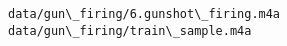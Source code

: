 \documentclass[11pt]{article}
\begin{document}
    \begin{Verbatim}[commandchars=\\\{\}]
data/gun\_firing/6.gunshot\_firing.m4a
data/gun\_firing/train\_sample.m4a

    \end{Verbatim}

    \begin{center}
    \end{center}
    { \hspace*{\fill} \\}
    
    \begin{center}
    \end{center}
    { \hspace*{\fill} \\}
    

    
    
    
    
\end{document}
